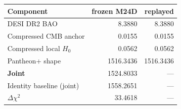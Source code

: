 \begin{tabular}{lrr}
\toprule
Component & frozen M24D & replayed \\
\midrule
DESI DR2 BAO & 8.3880 & 8.3880 \\
Compressed CMB anchor & 0.0155 & 0.0155 \\
Compressed local $H_0$ & 0.0562 & 0.0562 \\
Pantheon+ shape & 1516.3436 & 1516.3436 \\
\textbf{Joint} & 1524.8033 & --- \\
Identity baseline (joint) & 1558.2651 & --- \\
$\Delta\chi^2$ & 33.4618 & --- \\
\bottomrule
\end{tabular}
